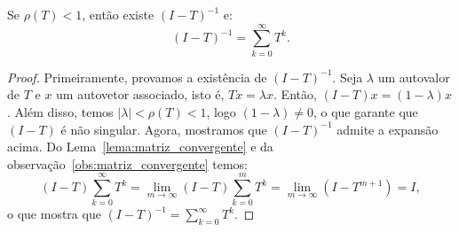 \begin{lem}\label{lema:inversa}
  Se $\rho(T) < 1$, então existe $(I - T)^{-1}$ e:
  \begin{equation*}
    (I - T)^{-1} = \sum_{k=0}^\infty T^k.
  \end{equation*}
\end{lem}
\begin{proof}
  Primeiramente, provamos a existência de $(I - T)^{-1}$. Seja $\lambda$ um autovalor de $T$ e $x$ um autovetor associado, isto é, $Tx = \lambda x$. Então, $(I-T)x = (1-\lambda)x$. Além disso, temos $|\lambda| < \rho(T) < 1$, logo $(1 - \lambda) \neq 0$, o que garante que $(I - T)$ é não singular.
  Agora, mostramos que $(I - T)^{-1}$ admite a expansão acima. Do Lema~\ref{lema:matriz_convergente} e da observação~\ref{obs:matriz_convergente} temos:
  \begin{equation*}
   (I - T)\sum_{k=0}^\infty T^k =  \lim_{m\to\infty} (I - T)\sum_{k=0}^m T^k = \lim_{m\to\infty} (I - T^{m+1}) = I,
  \end{equation*}
o que mostra que $\displaystyle (I - T)^{-1} = \sum_{k=0}^\infty T^k$.
\end{proof}

